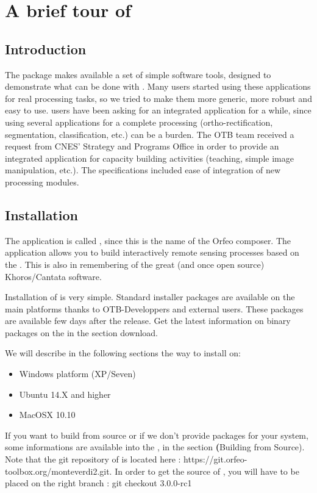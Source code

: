 \chapter{A brief tour of \mont}\label{chap:Monteverdi} 

\section{Introduction}\label{sec:montintro}
The \app package makes available a set of simple software
tools, designed to demonstrate what can be done with
\otb. Many users started using these applications for real processing
tasks, so we tried to make them more generic, more robust and easy to
use. \otb users have been asking for an integrated application for a
while, since using several applications for a complete processing
(ortho-rectification, segmentation, classification, etc.) can be a
burden. The OTB team received a request from CNES' Strategy
and Programs Office in order to provide an integrated application for
capacity building activities (teaching, simple image manipulation,
etc.). The specifications included ease of integration of new
processing modules.  


\section{Installation}\label{sec:montinstall}

The application is called \mont, since this is the name of the Orfeo
composer. The application allows you to build interactively remote
sensing processes based on the \otb. This is also in
remembering of the great (and once open source) Khoros/Cantata
software.
  
Installation of \mont is very simple. Standard installer packages are available on the main platforms thanks to OTB-Developpers and external users. 
These packages are available few days after the release. Get the latest information on binary packages on the \website in the section download.

We will describe in the following sections the way to install \mont on:
\begin{itemize}
\item Windows platform (XP/Seven)
\item Ubuntu 14.X and higher
\item MacOSX 10.10
\end{itemize}

If you want to build from source or if we don't provide packages for your system, some informations are available into the \sg, in the section \textbf(Building from Source).
Note that the git repository of \mont is located here : https://git.orfeo-toolbox.org/monteverdi2.git.
In order to get the source of \mont, you will have to be placed on the right branch : git checkout 3.0.0-rc1


